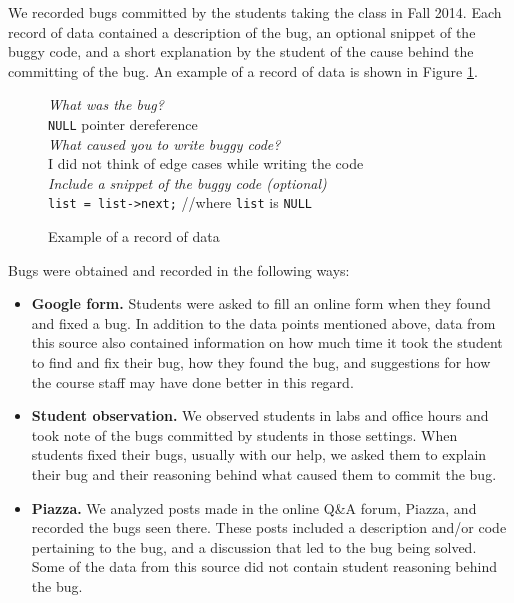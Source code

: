 \documentclass{sig-alternate}
\begin{document}
We recorded bugs committed by the students taking the class in Fall 2014. Each record of data contained a description of the bug, an optional snippet of the buggy code, and a short explanation by the student of the cause behind the committing of the bug. An example of a record of data is shown in Figure \ref{fig:record}.\\

\begin{figure}
\begin{framed}
\emph{What was the bug?}\\
\verb|NULL| pointer dereference\\

\emph{What caused you to write buggy code?}\\
 I did not think of edge cases while writing the code\\

\emph{Include a snippet of the buggy code (optional)}\\
\verb|list = list->next;| //where \verb|list| is \verb|NULL|
\end{framed}
\vspace{-0.1in}
\caption{Example of a record of data}
\label{fig:record}
\end{figure}

Bugs were obtained and recorded in the following ways:
\begin{itemize}
\item{\textbf{Google form.} Students were asked to fill an online form when they found and fixed a bug. In addition to the data points mentioned above, data from this source also contained information on how much time it took the student to find and fix their bug, how they found the bug, and suggestions for how the course staff may have done better in this regard.}

\item{\textbf{Student observation.} We observed students in labs and office hours and took note of the bugs committed by students in those settings. When students fixed their bugs, usually with our help, we asked them to explain their bug and their reasoning behind what caused them to commit the bug.}
\item{\textbf{Piazza.} We analyzed posts made in the online Q\&A forum, Piazza, and recorded the bugs seen there. These posts included a description and/or code pertaining to the bug, and a discussion that led to the bug being solved. Some of the data from this source did not contain student reasoning behind the bug.}
\end{itemize}
\end{document}
